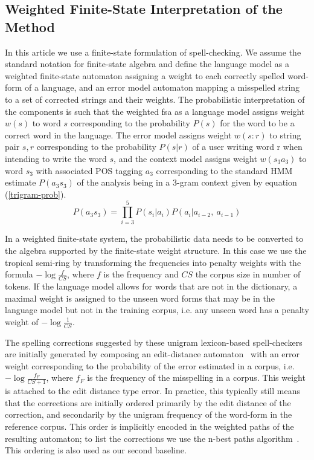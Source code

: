 \documentclass[postprint]{flammie}
\begin{document}
\subsection{Weighted Finite-State Interpretation of the Method}

In this article we use a finite-state formulation of
spell-checking. We assume the standard notation for finite-state
algebra and define the language model as a weighted finite-state
automaton assigning a weight to each correctly spelled word-form of a
language, and an error model automaton mapping a misspelled string to
a set of corrected strings and their weights. The probabilistic
interpretation of the components is such that the weighted fsa as a
language model assigns weight $w(s)$ to word $s$ corresponding to the
probability $P(s)$ for the word to be a correct word in the
language. The error model assigns weight $w(s:r)$ to string pair $s,
r$ corresponding to the probability $P(s|r)$ of a user writing word r
when intending to write the word $s$, and the context model assigns
weight $w(s_3 a_3)$ to word $s_3$ with associated POS tagging $a_3$
corresponding to the standard HMM estimate $P(a_3 s_3)$ of the analysis being in
a 3-gram context given by equation (\ref{trigram-prob}).
\begin{equation}\label{trigram-prob}
P(a_3 s_3) = \prod_{i=3}^{5}P(s_i|a_i)P(a_i|a_{i-2},\ a_{i-1})
\end{equation}


In a weighted finite-state system, the probabilistic data needs to be converted
to the algebra supported by the finite-state weight structure.  In this case we
use the tropical semi-ring by transforming the frequencies into penalty weights
with the formula $-\log\frac{f}{CS}$, where $f$ is the frequency and $CS$ the
corpus size in number of tokens. If the language model allows for words that
are not in the dictionary, a maximal weight is assigned to the unseen word
forms that may be in the language model but not in the training corpus, i.e.
any unseen word has a penalty weight of $-\log\frac{1}{CS}$.

The spelling corrections suggested by these unigram lexicon-based
spell-checkers are initially generated by composing an edit-distance
automaton~\cite{agata/2002} with an error weight corresponding to the
probability of the error estimated in a corpus, i.e. $-\log\frac{f_{F}}{CS+1}$,
where $f_F$ is the frequency of the misspelling in a corpus. This weight is
attached to the edit distance type error. In practice, this typically still
means that the corrections are initially ordered primarily by the edit distance
of the correction, and secondarily by the unigram frequency of the word-form in
the reference corpus.  This order is implicitly encoded in the weighted paths
of the resulting automaton; to list the corrections we use the n-best paths
algorithm~\cite{mohri/2002}. This ordering is also used as our second baseline.
\end{document}

